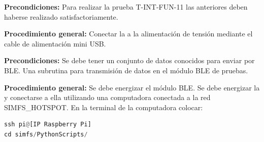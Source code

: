%
%
%

\label{sec:BancoDePruebas}
%


\label{sec:PlanValidacion}




\textbf{Precondiciones:}
Para realizar la prueba T-INT-FUN-11 las anteriores deben haberse realizado satisfactoriamente.

\textbf{Procedimiento general:}
Conectar la \rspi a la alimentación de tensión mediante el cable de alimentación mini USB.





\textbf{Precondiciones:} Se debe tener un conjunto de datos conocidos para enviar por BLE. Una subrutina para transmisión de datos en el módulo BLE de pruebas.

\textbf{Procedimiento general:} Se debe energizar el módulo BLE. Se debe energizar la \rspi y conectarse a ella utilizando una computadora conectada a la red
SIMFS\_HOTSPOT. En la terminal de la computadora colocar:
\begin{lstlisting}[language=Python]
ssh pi@[IP Raspberry Pi] 
cd simfs/PythonScripts/
\end{lstlisting}





\label{sec:MatrizTrazabilidad}


